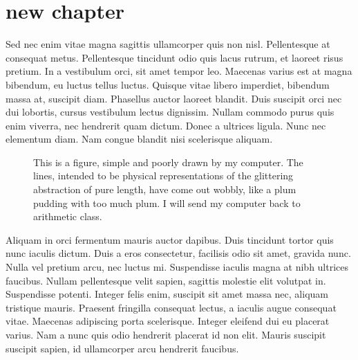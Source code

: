 \documentclass[11pt,a4paper]{memoir}\usepackage[]{graphicx}\usepackage[]{color}
\begin{document}
\chapter{new chapter}

Sed nec enim vitae magna sagittis ullamcorper quis non nisl. Pellentesque at consequat metus. Pellentesque tincidunt odio quis lacus rutrum, et laoreet risus pretium. In a vestibulum orci, sit amet tempor leo. Maecenas varius est at magna bibendum, eu luctus tellus luctus. Quisque vitae libero imperdiet, bibendum massa at, suscipit diam. Phasellus auctor laoreet blandit. Duis suscipit orci nec dui lobortis, cursus vestibulum lectus dignissim. Nullam commodo purus quis enim viverra, nec hendrerit quam dictum. Donec a ultrices ligula. Nunc nec elementum diam. Nam congue blandit nisi scelerisque aliquam.


\begin{figure}
\begin{adjustwidth*}{-1in}{0pt}
\centering
{}
\end{adjustwidth*}
\caption{This is a figure, simple and poorly drawn by my computer. The lines, intended to be physical representations of the glittering abstraction of pure length, have come out wobbly, like a plum pudding with too much plum. I will send my computer back to arithmetic class.}
\end{figure}

Aliquam in orci fermentum mauris auctor dapibus. Duis tincidunt tortor quis nunc iaculis dictum. Duis a eros consectetur, facilisis odio sit amet, gravida nunc. Nulla vel pretium arcu, nec luctus mi. Suspendisse iaculis magna at nibh ultrices faucibus. Nullam pellentesque velit sapien, sagittis molestie elit volutpat in. Suspendisse potenti. Integer felis enim, suscipit sit amet massa nec, aliquam tristique mauris. Praesent fringilla consequat lectus, a iaculis augue consequat vitae. Maecenas adipiscing porta scelerisque. Integer eleifend dui eu placerat varius. Nam a nunc quis odio hendrerit placerat id non elit. Mauris suscipit suscipit sapien, id ullamcorper arcu hendrerit faucibus.
\end{document}

